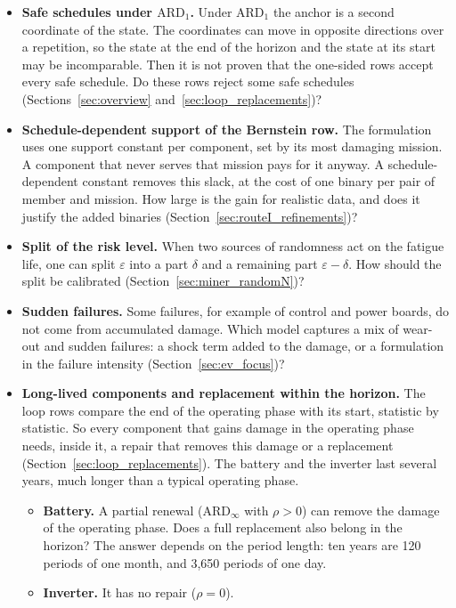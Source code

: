 \documentclass[11pt,a4paper]{article}
\theoremstyle{plain}
\theoremstyle{definition}
\theoremstyle{remark}
\begin{document}
\begin{itemize}
    Its value is not known.
  \item \textbf{Safe schedules under $\text{ARD}_1$.}
    Under $\text{ARD}_1$ the anchor is a second coordinate of the state.
    The coordinates can move in opposite directions over a repetition, so the state at the end of the horizon and the state at its start may be incomparable.
    Then it is not proven that the one-sided rows accept every safe schedule.
    Do these rows reject some safe schedules (Sections~\ref{sec:overview} and~\ref{sec:loop_replacements})?
  \item \textbf{Schedule-dependent support of the Bernstein row.}
    The formulation uses one support constant per component, set by its most damaging mission.
    A component that never serves that mission pays for it anyway.
    A schedule-dependent constant removes this slack, at the cost of one binary per pair of member and mission.
    How large is the gain for realistic data, and does it justify the added binaries (Section~\ref{sec:routeI_refinements})?
  \item \textbf{Split of the risk level.}
    When two sources of randomness act on the fatigue life, one can split $\varepsilon$ into a part $\delta$ and a remaining part $\varepsilon - \delta$.
    How should the split be calibrated (Section~\ref{sec:miner_randomN})?
  \item \textbf{Sudden failures.}
    Some failures, for example of control and power boards, do not come from accumulated damage.
    Which model captures a mix of wear-out and sudden failures: a shock term added to the damage, or a formulation in the failure intensity (Section~\ref{sec:ev_focus})?
  \item \textbf{Long-lived components and replacement within the horizon.}
    The loop rows compare the end of the operating phase with its start, statistic by statistic.
    So every component that gains damage in the operating phase needs, inside it, a repair that removes this damage or a replacement (Section~\ref{sec:loop_replacements}).
    The battery and the inverter last several years, much longer than a typical operating phase.
    \begin{itemize}
      \item \textbf{Battery.} A partial renewal ($\text{ARD}_\infty$ with $\rho > 0$) can remove the damage of the operating phase.
        Does a full replacement also belong in the horizon?
        The answer depends on the period length: ten years are 120 periods of one month, and 3,650 periods of one day.
      \item \textbf{Inverter.} It has no repair ($\rho = 0$).

\end{itemize}
\end{itemize}
\end{document}
